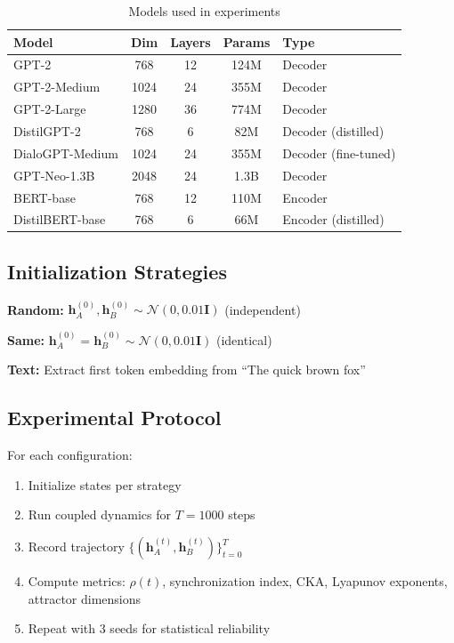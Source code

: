 \documentclass[10pt]{article} %
\theoremstyle{plain}
\theoremstyle{definition}
\theoremstyle{remark}
\newcommand{\vect}[1]{\bm{#1}}
\newcommand{\mat}[1]{\mathbf{#1}}
\begin{document}
\begin{table}[htbp]
\centering
\caption{Models used in experiments}
\label{tab:models}
\small
\begin{tabular}{lcccl}
\toprule
\textbf{Model} & \textbf{Dim} & \textbf{Layers} & \textbf{Params} & \textbf{Type} \\
\midrule
GPT-2 & 768 & 12 & 124M & Decoder \\
GPT-2-Medium & 1024 & 24 & 355M & Decoder \\
GPT-2-Large & 1280 & 36 & 774M & Decoder \\
DistilGPT-2 & 768 & 6 & 82M & Decoder (distilled) \\
DialoGPT-Medium & 1024 & 24 & 355M & Decoder (fine-tuned) \\
\midrule
GPT-Neo-1.3B & 2048 & 24 & 1.3B & Decoder \\
\midrule
BERT-base & 768 & 12 & 110M & Encoder \\
DistilBERT-base & 768 & 6 & 66M & Encoder (distilled) \\
\bottomrule
\end{tabular}
\end{table}

\subsection{Initialization Strategies}

\textbf{Random:} $\vect{h}_A^{(0)}, \vect{h}_B^{(0)} \sim \mathcal{N}(0, 0.01\mat{I})$ (independent)

\textbf{Same:} $\vect{h}_A^{(0)} = \vect{h}_B^{(0)} \sim \mathcal{N}(0, 0.01\mat{I})$ (identical)

\textbf{Text:} Extract first token embedding from ``The quick brown fox''

\subsection{Experimental Protocol}

For each configuration:
\begin{enumerate}
    \item Initialize states per strategy
    \item Run coupled dynamics for $T = 1000$ steps
    \item Record trajectory $\{(\vect{h}_A^{(t)}, \vect{h}_B^{(t)})\}_{t=0}^{T}$
    \item Compute metrics: $\rho(t)$, synchronization index, CKA, Lyapunov exponents, attractor dimensions
    \item Repeat with 3 seeds for statistical reliability
\end{enumerate}
\end{document}

